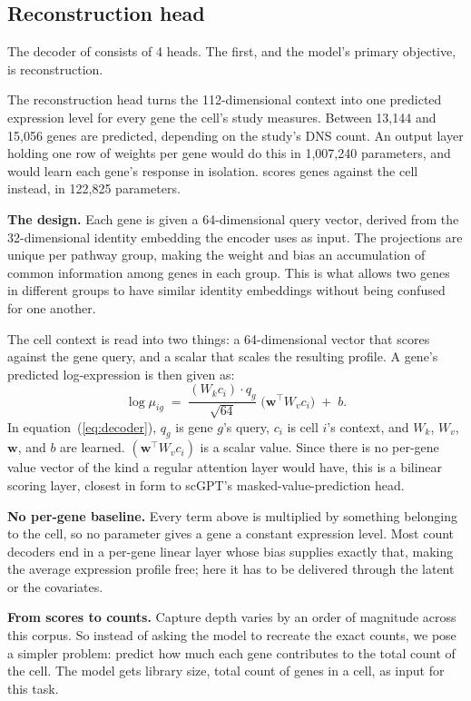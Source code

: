 \subsection*{Reconstruction head}

The decoder of \elaj consists of 4 heads. The first, and the model’s 
primary objective, is reconstruction.

The reconstruction head turns the 112-dimensional context into one
predicted expression level for every gene the cell's study measures.
Between 13{,}144 and 15{,}056 genes are predicted, depending on the
study's DNS count. An output layer holding one row of weights per gene
would do this in 1{,}007{,}240 parameters, and would learn each gene's
response in isolation. \elaj scores genes against the cell instead, in
122{,}825 parameters.

\textbf{The design.} Each gene is given a 64-dimensional query vector,
derived from the 32-dimensional identity embedding the encoder uses as
input. The projections are unique per pathway group, making the 
weight and bias an accumulation of common information among genes in 
each group. This is what allows two genes in different groups to have 
similar identity embeddings without being confused for one another.

The cell context is read into two things: a 64-dimensional vector that 
scores against the gene query, and a scalar that scales the resulting 
profile. A gene's predicted log-expression is then given as:
\begin{equation}
\log \mu_{ig} \;=\; \frac{(W_k c_i) \cdot q_g}{\sqrt{64}}
\;\big(\mathbf{w}^\top W_v c_i\big) \;+\; b .
\label{eq:decoder}
\end{equation}
In equation~(\ref{eq:decoder}), $q_g$ is gene $g$'s query, $c_i$ is cell $i$'s context, and $W_k$,
$W_v$, $\mathbf{w}$, and $b$ are learned. $(\mathbf{w}^\top W_v c_i)$ is a
scalar value. Since there is no per-gene value vector of the kind a regular
attention layer would have, this is a bilinear scoring layer, closest in
form to scGPT's masked-value-prediction head.

\textbf{No per-gene baseline.} Every term above is multiplied by something
belonging to the cell, so no parameter gives a gene a constant expression
level. Most count decoders end in a per-gene linear layer whose bias
supplies exactly that, making the average expression profile free; here it
has to be delivered through the latent or the covariates.

\textbf{From scores to counts.} Capture depth varies by an order of 
magnitude across this corpus. So instead of asking the model to recreate 
the exact counts, we pose a simpler problem: predict how much each gene 
contributes to the total count of the cell. The model gets library size, 
total count of genes in a cell, as input for this task.

